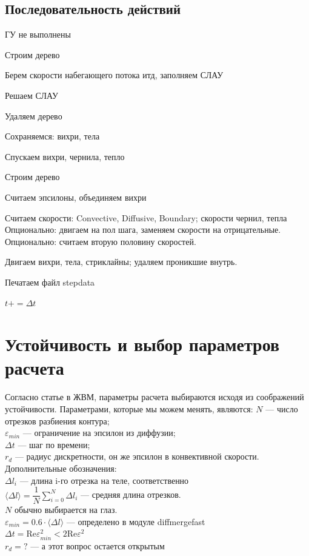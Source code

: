\documentclass[14pt]{extreport}
\newcommand{\Reyn}{\text{Re}}
\newenvironment{packed_enum}{
\begin{enumerate}
  \setlength{\itemsep}{1pt}
  \setlength{\parskip}{0pt}
  \setlength{\parsep}{0pt}
}{\end{enumerate}}
\begin{document}
\subsection{Последовательность действий}
\begin{packed_enum}
\item ГУ не выполнены\\
\item Строим дерево
\item Берем скорости набегающего потока итд, заполняем СЛАУ
\item Решаем СЛАУ
\item Удаляем дерево\\
\item Сохраняемся: вихри, тела
\item Спускаем вихри, чернила, тепло\\
\item Строим дерево
\item Считаем эпсилоны, объединяем вихри
\item Считаем скорости: Convective, Diffusive, Boundary; скорости чернил, тепла
\subitem Опционально: двигаем на пол шага, заменяем скорости на отрицательные.
\subitem Опционально: считаем вторую половину скоростей.
\item Двигаем вихри, тела, стриклайны; удаляем проникшие внутрь.
\item Печатаем файл stepdata
\item $t += \Delta t$
\end{packed_enum}

\newpage
\section{Устойчивость и выбор параметров расчета}
Согласно статье в ЖВМ, параметры расчета выбираются исходя из
соображений устойчивости. Параметрами, которые мы можем менять, являются:
$N$ --- число отрезков разбиения контура;\\
$\varepsilon_{min}$ --- ограничение на эпсилон из диффузии;\\
$\Delta t$ --- шаг по времени;\\
$r_d$ --- радиус дискретности, он же эпсилон в конвективной скорости.\\

Дополнительные обозначения:\\
$\Delta l_i$ --- длина i-го отрезка на теле, соответственно \\
$\langle\Delta l \rangle=\dfrac{1}{N} \sum\limits_{i=0}^{N} \Delta l_i$ ---
средняя длина отрезков.\\
$N$ обычно выбирается на глаз.\\
$\varepsilon_{min}=0.6\cdot\langle\Delta l \rangle$ --- 
определено в модуле diffmergefast\\
$\Delta t = \Reyn \varepsilon_{min}^2 < 2 \Reyn \varepsilon^2$\\
$r_d = ?$ --- а этот вопрос остается открытым \\
\end{document}
